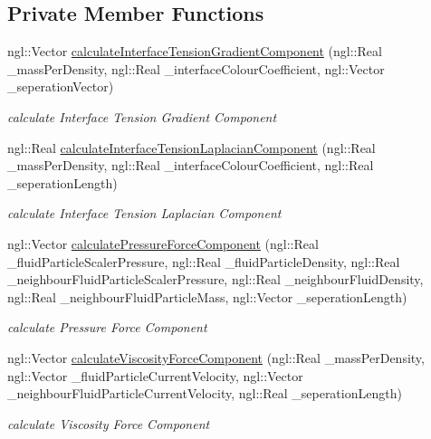 \subsection*{Private Member Functions}
\begin{DoxyCompactItemize}
\item 
ngl::Vector \hyperlink{class_s_p_h_solver_af6b1adebbc96d3cb22f6990a05694f70}{calculateInterfaceTensionGradientComponent} (ngl::Real \_\-massPerDensity, ngl::Real \_\-interfaceColourCoefficient, ngl::Vector \_\-seperationVector)
\begin{DoxyCompactList}\small\item\em calculate Interface Tension Gradient Component \item\end{DoxyCompactList}\item 
ngl::Real \hyperlink{class_s_p_h_solver_ac1f193569656db4fe11aa5f716c5169b}{calculateInterfaceTensionLaplacianComponent} (ngl::Real \_\-massPerDensity, ngl::Real \_\-interfaceColourCoefficient, ngl::Real \_\-seperationLength)
\begin{DoxyCompactList}\small\item\em calculate Interface Tension Laplacian Component \item\end{DoxyCompactList}\item 
ngl::Vector \hyperlink{class_s_p_h_solver_ad137f4330190d8627fdb93ba373bb406}{calculatePressureForceComponent} (ngl::Real \_\-fluidParticleScalerPressure, ngl::Real \_\-fluidParticleDensity, ngl::Real \_\-neighbourFluidParticleScalerPressure, ngl::Real \_\-neighbourFluidDensity, ngl::Real \_\-neighbourFluidParticleMass, ngl::Vector \_\-seperationLength)
\begin{DoxyCompactList}\small\item\em calculate Pressure Force Component \item\end{DoxyCompactList}\item 
ngl::Vector \hyperlink{class_s_p_h_solver_a5913e7c1cd5a66c51eb03762025c0782}{calculateViscosityForceComponent} (ngl::Real \_\-massPerDensity, ngl::Vector \_\-fluidParticleCurrentVelocity, ngl::Vector \_\-neighbourFluidParticleCurrentVelocity, ngl::Real \_\-seperationLength)
\begin{DoxyCompactList}\small\item\em calculate Viscosity Force Component \item\end{DoxyCompactList}\item 

\end{DoxyCompactItemize}
